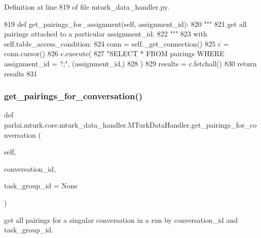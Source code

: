 Definition at line 819 of file mturk\+\_\+data\+\_\+handler.\+py.


\begin{DoxyCode}
819     \textcolor{keyword}{def }get\_pairings\_for\_assignment(self, assignment\_id):
820         \textcolor{stringliteral}{"""}
821 \textcolor{stringliteral}{        get all pairings attached to a particular assignment\_id.}
822 \textcolor{stringliteral}{        """}
823         with self.table\_access\_condition:
824             conn = self.\_get\_connection()
825             c = conn.cursor()
826             c.execute(
827                 \textcolor{stringliteral}{"SELECT * FROM pairings WHERE assignment\_id = ?;"}, (assignment\_id,)
828             )
829             results = c.fetchall()
830             \textcolor{keywordflow}{return} results
831 
\end{DoxyCode}
\mbox{\label{classparlai_1_1mturk_1_1core_1_1mturk__data__handler_1_1MTurkDataHandler_a7456a75caea9fb681067dee584567f27}} 
\subsubsection{\texorpdfstring{get\+\_\+pairings\+\_\+for\+\_\+conversation()}{get\_pairings\_for\_conversation()}}
{\footnotesize\ttfamily def parlai.\+mturk.\+core.\+mturk\+\_\+data\+\_\+handler.\+M\+Turk\+Data\+Handler.\+get\+\_\+pairings\+\_\+for\+\_\+conversation (\begin{DoxyParamCaption}\item[{}]{self,  }\item[{}]{conversation\+\_\+id,  }\item[{}]{task\+\_\+group\+\_\+id = {\ttfamily None} }\end{DoxyParamCaption})}

\begin{DoxyVerb}get all pairings for a singular conversation in a run by conversation_id and
task_group_id.
\end{DoxyVerb}
 

